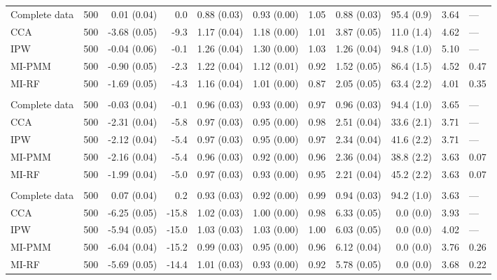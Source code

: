 \begin{longtable}{l|rrrrrrrrrl}
\midrule\addlinespace[2.5pt]
\multicolumn{11}{l}{Stunting — MAR-strong 50\%} \\[2.5pt] 
\midrule\addlinespace[2.5pt]
Complete data & 500 & 0.01 (0.04) & 0.0 & 0.88 (0.03) & 0.93 (0.00) & 1.05 & 0.88 (0.03) & 95.4 (0.9) & 3.64 & — \\ 
CCA & 500 & -3.68 (0.05) & -9.3 & 1.17 (0.04) & 1.18 (0.00) & 1.01 & 3.87 (0.05) & 11.0 (1.4) & 4.62 & — \\ 
IPW & 500 & -0.04 (0.06) & -0.1 & 1.26 (0.04) & 1.30 (0.00) & 1.03 & 1.26 (0.04) & 94.8 (1.0) & 5.10 & — \\ 
MI-PMM & 500 & -0.90 (0.05) & -2.3 & 1.22 (0.04) & 1.12 (0.01) & 0.92 & 1.52 (0.05) & 86.4 (1.5) & 4.52 & 0.47 \\ 
MI-RF & 500 & -1.69 (0.05) & -4.3 & 1.16 (0.04) & 1.01 (0.00) & 0.87 & 2.05 (0.05) & 63.4 (2.2) & 4.01 & 0.35 \\ 
\midrule\addlinespace[2.5pt]
\multicolumn{11}{l}{Stunting — MNAR 10\%} \\[2.5pt] 
\midrule\addlinespace[2.5pt]
Complete data & 500 & -0.03 (0.04) & -0.1 & 0.96 (0.03) & 0.93 (0.00) & 0.97 & 0.96 (0.03) & 94.4 (1.0) & 3.65 & — \\ 
CCA & 500 & -2.31 (0.04) & -5.8 & 0.97 (0.03) & 0.95 (0.00) & 0.98 & 2.51 (0.04) & 33.6 (2.1) & 3.71 & — \\ 
IPW & 500 & -2.12 (0.04) & -5.4 & 0.97 (0.03) & 0.95 (0.00) & 0.97 & 2.34 (0.04) & 41.6 (2.2) & 3.71 & — \\ 
MI-PMM & 500 & -2.16 (0.04) & -5.4 & 0.96 (0.03) & 0.92 (0.00) & 0.96 & 2.36 (0.04) & 38.8 (2.2) & 3.63 & 0.07 \\ 
MI-RF & 500 & -1.99 (0.04) & -5.0 & 0.97 (0.03) & 0.93 (0.00) & 0.95 & 2.21 (0.04) & 45.2 (2.2) & 3.63 & 0.07 \\ 
\midrule\addlinespace[2.5pt]
\multicolumn{11}{l}{Stunting — MNAR 30\%} \\[2.5pt] 
\midrule\addlinespace[2.5pt]
Complete data & 500 & 0.07 (0.04) & 0.2 & 0.93 (0.03) & 0.92 (0.00) & 0.99 & 0.94 (0.03) & 94.2 (1.0) & 3.63 & — \\ 
CCA & 500 & -6.25 (0.05) & -15.8 & 1.02 (0.03) & 1.00 (0.00) & 0.98 & 6.33 (0.05) & 0.0 (0.0) & 3.93 & — \\ 
IPW & 500 & -5.94 (0.05) & -15.0 & 1.03 (0.03) & 1.03 (0.00) & 1.00 & 6.03 (0.05) & 0.0 (0.0) & 4.02 & — \\ 
MI-PMM & 500 & -6.04 (0.04) & -15.2 & 0.99 (0.03) & 0.95 (0.00) & 0.96 & 6.12 (0.04) & 0.0 (0.0) & 3.76 & 0.26 \\ 
MI-RF & 500 & -5.69 (0.05) & -14.4 & 1.01 (0.03) & 0.93 (0.00) & 0.92 & 5.78 (0.05) & 0.0 (0.0) & 3.68 & 0.22 \\ 

\end{longtable}
